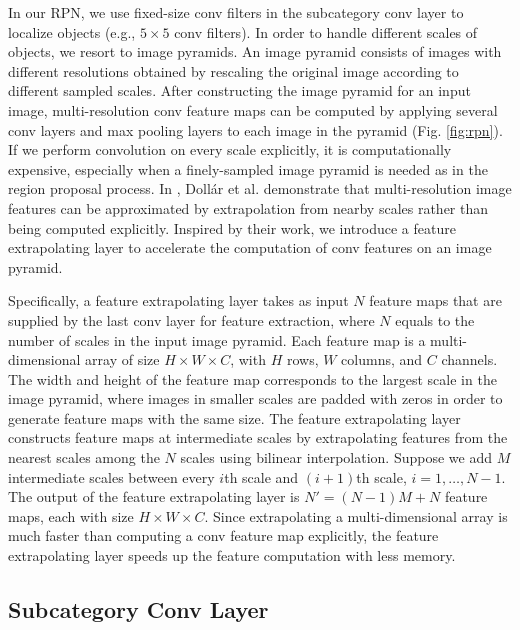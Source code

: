 \documentclass[10pt,twocolumn,letterpaper]{article}
\begin{document}
In our RPN, we use fixed-size conv filters in the subcategory conv layer to localize objects (e.g., $5\times5$ conv filters). In order to handle different scales of objects, we resort to image pyramids. An image pyramid consists of images with different resolutions obtained by rescaling the original image according to different sampled scales. After constructing the image pyramid for an input image, multi-resolution conv feature maps can be computed by applying several conv layers and max pooling layers to each image in the pyramid (Fig. \ref{fig:rpn}). If we perform convolution on every scale explicitly, it is computationally expensive, especially when a finely-sampled image pyramid is needed as in the region proposal process. In \cite{DollarPAMI14pyramids}, Doll\'{a}r et al. demonstrate that multi-resolution image features can be approximated by extrapolation from nearby scales rather than being computed explicitly. Inspired by their work, we introduce a feature extrapolating layer to accelerate the computation of conv features on an image pyramid.

Specifically, a feature extrapolating layer takes as input $N$ feature maps that are supplied by the last conv layer for feature extraction, where $N$ equals to the number of scales in the input image pyramid. Each feature map is a multi-dimensional array of size $H \times W \times C$, with $H$ rows, $W$ columns, and $C$ channels. The width and height of the feature map corresponds to the largest scale in the image pyramid, where images in smaller scales are padded with zeros in order to generate feature maps with the same size. The feature extrapolating layer constructs feature maps at intermediate scales by extrapolating features from the nearest scales among the $N$ scales using bilinear interpolation. Suppose we add $M$ intermediate scales between every $i$th scale and $(i+1)$th scale, $i=1,\ldots,N-1$. The output of the feature extrapolating layer is $N'=(N-1)M + N$ feature maps, each with size $H \times W \times C$. Since extrapolating a multi-dimensional array is much faster than computing a conv feature map explicitly, the feature extrapolating layer speeds up the feature computation with less memory.

\subsection{Subcategory Conv Layer}
\end{document}

